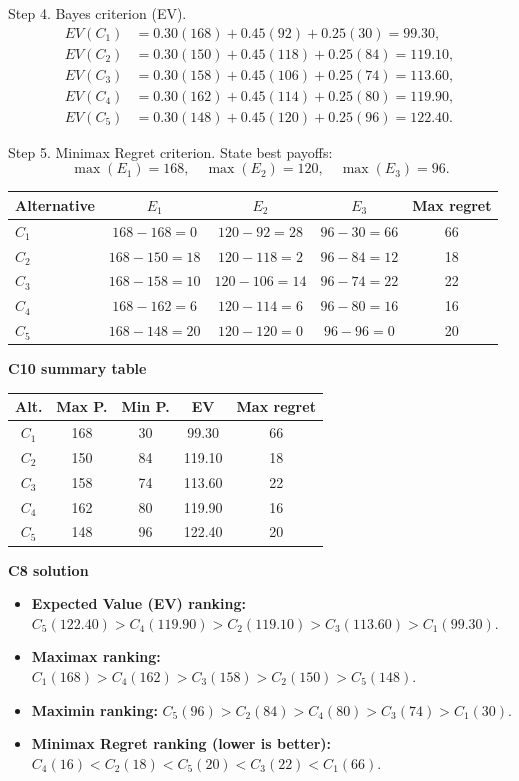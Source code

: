 \begin{ExamProblems}
		Step 4. Bayes criterion (EV).
		\[
		\begin{aligned}
		EV(C_1)&=0.30(168)+0.45(92)+0.25(30)=99.30,\\
		EV(C_2)&=0.30(150)+0.45(118)+0.25(84)=119.10,\\
		EV(C_3)&=0.30(158)+0.45(106)+0.25(74)=113.60,\\
		EV(C_4)&=0.30(162)+0.45(114)+0.25(80)=119.90,\\
		EV(C_5)&=0.30(148)+0.45(120)+0.25(96)=122.40.
		\end{aligned}
		\]

		Step 5. Minimax Regret criterion.
		State best payoffs:
		\[
		\max(E_1)=168,\quad \max(E_2)=120,\quad \max(E_3)=96.
		\]
		\begin{center}
			\begin{tabular}{l c c c c}
				\toprule
				Alternative & $E_1$ & $E_2$ & $E_3$ & Max regret \\
				\midrule
				$C_1$ & $168-168=0$ & $120-92=28$ & $96-30=66$ & 66 \\
				$C_2$ & $168-150=18$ & $120-118=2$ & $96-84=12$ & 18 \\
				$C_3$ & $168-158=10$ & $120-106=14$ & $96-74=22$ & 22 \\
				$C_4$ & $168-162=6$ & $120-114=6$ & $96-80=16$ & 16 \\
				$C_5$ & $168-148=20$ & $120-120=0$ & $96-96=0$ & 20 \\
				\bottomrule
			\end{tabular}
		\end{center}

		\textbf{C10 summary table}
		\begin{center}
			\begin{tabular}{c c c c c}
				\toprule
				Alt. & Max P. & Min P. & EV & Max regret \\
				\midrule
				$C_1$ & 168 & 30 & 99.30 & 66 \\
				$C_2$ & 150 & 84 & 119.10 & 18 \\
				$C_3$ & 158 & 74 & 113.60 & 22 \\
				$C_4$ & 162 & 80 & 119.90 & 16 \\
				$C_5$ & 148 & 96 & 122.40 & 20 \\
				\bottomrule
			\end{tabular}
		\end{center}

		\textbf{C8 solution}
		\begin{itemize}
			\item \textbf{Expected Value (EV) ranking:} $C_5(122.40)>C_4(119.90)>C_2(119.10)>C_3(113.60)>C_1(99.30)$.
			\item \textbf{Maximax ranking:} $C_1(168)>C_4(162)>C_3(158)>C_2(150)>C_5(148)$.
			\item \textbf{Maximin ranking:} $C_5(96)>C_2(84)>C_4(80)>C_3(74)>C_1(30)$.
			\item \textbf{Minimax Regret ranking (lower is better):} $C_4(16)<C_2(18)<C_5(20)<C_3(22)<C_1(66)$.
		\end{itemize}


\end{ExamProblems}
